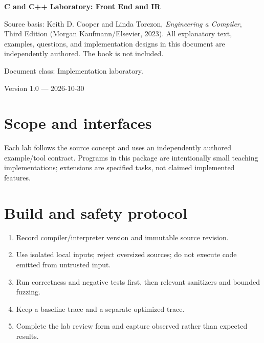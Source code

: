 \documentclass[10pt,letterpaper]{article}
\begin{document}
\begin{titlepage}
\centering\vspace*{1.0in}
{\Huge\bfseries\textcolor{CompilerBlue}{C and C++ Laboratory: Front End and IR}\par}
\vspace{.22in}{\Large Executable reference kernels plus guided extensions\par}
\vspace{.4in}{\large Compiler Engineering Documentation Suite\par}
\vfill
\begin{minipage}{.86\linewidth}\small
Source basis: Keith D. Cooper and Linda Torczon, \emph{Engineering a Compiler}, Third Edition (Morgan Kaufmann/Elsevier, 2023). All explanatory text, examples, questions, and implementation designs in this document are independently authored. The book is not included.\par\medskip
Document class: Implementation laboratory.
\end{minipage}
\vfill\textcolor{CompilerGray}{Version 1.0 --- 2026-10-30}\par
\end{titlepage}
\tableofcontents\clearpage
\section{Scope and interfaces}
Each lab follows the source concept and uses an independently authored example/tool contract. Programs in this package are intentionally small teaching implementations; extensions are specified tasks, not claimed implemented features.

\section{Build and safety protocol}
\begin{enumerate}
\item Record compiler/interpreter version and immutable source revision.
\item Use isolated local inputs; reject oversized sources; do not execute code emitted from untrusted input.
\item Run correctness and negative tests first, then relevant sanitizers and bounded fuzzing.
\item Keep a baseline trace and a separate optimized trace.
\item Complete the lab review form and capture observed rather than expected results.
\end{enumerate}
\end{document}

